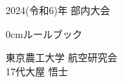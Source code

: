 





% 

\begin{center}
		{\Large
		2024(令和6)年 部内大会
		}
	\end{center}
	\begin{center}
		\vspace*{100truept}
		{\fontsize{22pt} {0cm}\selectfont ルールブック}\\ %
		\vspace{30truept}
	\end{center}
	\begin{center}
		\vspace{170truept}	
		\vspace{15truept}	
		{\LARGE 東京農工大学 }
		{\LARGE 航空研究会}\\ 
		\vspace{15truept}
		{\LARGE 17代\hspace{5mm}大屋 悟士}\\ %
		\vspace{50truept}
		\vspace{20truept}
	\end{center}
% 
